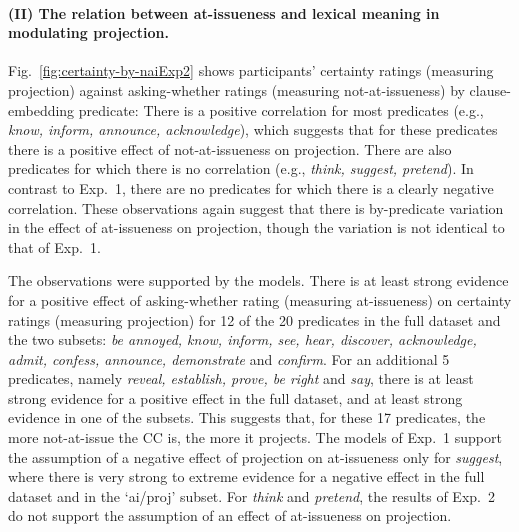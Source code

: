 \documentclass[11pt,fleqn]{article}
\newcommand{\6}{\mbox{$[\hspace*{-.6mm}[$}}
\newcommand{\9}{\mbox{$]\hspace*{-.6mm}]$}}
\begin{document}
                          
\paragraph{(II) The relation between at-issueness and lexical meaning in modulating projection.}  Fig.~\ref{fig:certainty-by-naiExp2} shows participants' certainty ratings (measuring projection) against asking-whether ratings (measuring not-at-issueness) by clause-embedding predicate: There is a positive correlation for most predicates (e.g., {\em know, inform, announce, acknowledge}), which suggests that for these predicates there is a positive effect of not-at-issueness on projection. There are also predicates for which there is no correlation (e.g., {\em think, suggest, pretend}). In contrast to Exp.~1, there are no predicates for which there is a clearly negative correlation. These observations again suggest that there is by-predicate variation in the effect of at-issueness on projection, though the variation is not identical to that of Exp.~1. 

The observations were supported by the models. There is at least strong evidence for a positive effect of asking-whether rating (measuring at-issueness) on certainty ratings (measuring projection) for 12 of the 20 predicates in the full dataset and the two subsets: {\em be annoyed, know, inform, see, hear, discover, acknowledge, admit, confess, announce, demonstrate} and {\em confirm}. For an additional 5 predicates, namely {\em reveal, establish, prove, be right} and {\em say}, there is at least strong evidence for a positive effect in the full dataset, and at least strong evidence in one of the subsets. This suggests that, for these 17 predicates, the more not-at-issue the CC is, the more it projects. The models of Exp.~1 support the assumption of a negative effect of projection on at-issueness only for {\em suggest}, where there is very strong to extreme evidence for a negative effect in the full dataset and in the `ai/proj' subset. For {\em think} and {\em pretend}, the results of Exp.~2 do not support the assumption of an effect of at-issueness on projection.
\end{document}
